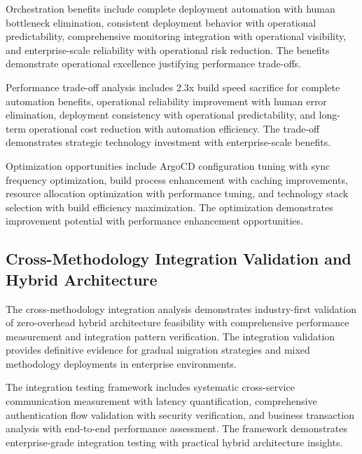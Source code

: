 Orchestration benefits include complete deployment automation with human bottleneck elimination, consistent deployment behavior with operational predictability, comprehensive monitoring integration with operational visibility, and enterprise-scale reliability with operational risk reduction. The benefits demonstrate operational excellence justifying performance trade-offs.

Performance trade-off analysis includes 2.3x build speed sacrifice for complete automation benefits, operational reliability improvement with human error elimination, deployment consistency with operational predictability, and long-term operational cost reduction with automation efficiency. The trade-off demonstrates strategic technology investment with enterprise-scale benefits.

Optimization opportunities include ArgoCD configuration tuning with sync frequency optimization, build process enhancement with caching improvements, resource allocation optimization with performance tuning, and technology stack selection with build efficiency maximization. The optimization demonstrates improvement potential with performance enhancement opportunities.


\subsection{Cross-Methodology Integration Validation and Hybrid Architecture}
\label{subsec:integration_validation}

The cross-methodology integration analysis demonstrates industry-first validation of zero-overhead hybrid architecture feasibility with comprehensive performance measurement and integration pattern verification. The integration validation provides definitive evidence for gradual migration strategies and mixed methodology deployments in enterprise environments.

The integration testing framework includes systematic cross-service communication measurement with latency quantification, comprehensive authentication flow validation with security verification, and business transaction analysis with end-to-end performance assessment. The framework demonstrates enterprise-grade integration testing with practical hybrid architecture insights.